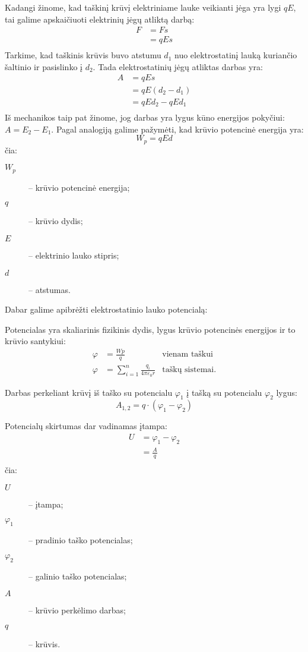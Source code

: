 Kadangi žinome, kad taškinį krūvį elektriniame lauke veikianti jėga
yra lygi $qE$, tai galime apskaičiuoti elektrinių jėgų atliktą darbą:
\begin{align*}
  F
  &= Fs \\
  &= qEs \\
\end{align*}
Tarkime, kad taškinis krūvis buvo atstumu $d_{1}$ nuo elektrostatinį
lauką kuriančio šaltinio ir pasislinko į $d_{2}$. Tada elektrostatinių
jėgų atliktas darbas yra:
\begin{align*}
  A
  &= qEs \\
  &= qE\left( d_{2} - d_{1} \right) \\
  &= qEd_{2} - qEd_{1} \\
\end{align*}
Iš mechanikos taip pat žinome, jog darbas yra lygus kūno energijos 
pokyčiui: $A = E_{2} - E_{1}$. Pagal analogiją galime pažymėti, kad
krūvio potencinė energija yra:
\begin{equation*}
  W_{p} = qEd
\end{equation*}
čia:
\begin{description}
  \item[$W_{p}$] – krūvio potencinė energija;
  \item[$q$] – krūvio dydis;
  \item[$E$] – elektrinio lauko stipris;
  \item[$d$] – atstumas.
\end{description}

Dabar galime apibrėžti elektrostatinio lauko potencialą:
\begin{defn}
  Potencialas yra skaliarinis fizikinis dydis, lygus krūvio potencinės
  energijos ir to krūvio santykiui:
  \begin{align*}
    \varphi &= \frac{Wp}{q} & \text{vienam taškui} \\
    \varphi &= \sum ^{n} _{i=1} \frac{q_{i}}{4 \pi \varepsilon_{0} r} 
      & \text{taškų sistemai}.
  \end{align*}
\end{defn}

Darbas perkeliant krūvį iš taško su potencialu $\varphi_{1}$ į tašką
su potencialu $\varphi_{2}$ lygus:
\begin{equation*}
  A_{1,2} = q \cdot (\varphi_{1} - \varphi_{2})
\end{equation*}

Potencialų skirtumas dar vadinamas įtampa:
\begin{align*}
  U
  &= \varphi_{1} - \varphi_{2} \\
  &= \frac{A}{q} \\
\end{align*}
čia:
\begin{description}
  \item[$U$] – įtampa;
  \item[$\varphi_{1}$] – pradinio taško potencialas;
  \item[$\varphi_{2}$] – galinio taško potencialas;
  \item[$A$] – krūvio perkėlimo darbas;
  \item[$q$] – krūvis.
\end{description}


